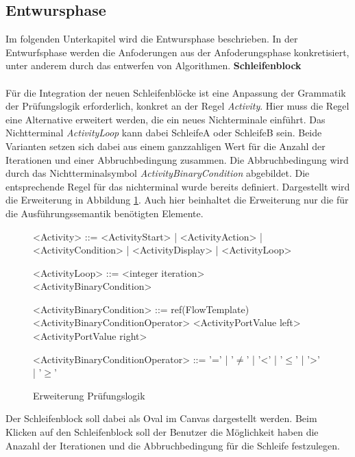 \documentclass{article}
\begin{document}
    \subsection{Entwursphase}
    Im folgenden Unterkapitel wird die Entwursphase beschrieben.
    In der Entwurfsphase werden die Anfoderungen aus der Anfoderungsphase konkretisiert, unter anderem durch das entwerfen von Algorithmen. \cite{24}
    \textbf{Schleifenblock}\\
    \\
    Für die Integration der neuen Schleifenblöcke ist eine Anpassung der Grammatik der Prüfungslogik erforderlich, konkret an der Regel \textit{Activity}.    
    Hier muss die Regel eine Alternative erweitert werden, die ein neues Nichterminale einführt.
    Das Nichtterminal \textit{ActivityLoop} kann dabei SchleifeA oder SchleifeB sein.
    Beide Varianten setzen sich dabei aus einem ganzzahligen Wert für die Anzahl der Iterationen und einer Abbruchbedingung zusammen.
    Die Abbruchbedingung wird durch das Nichtterminalsymbol \textit{ActivityBinaryCondition} abgebildet.
    Die entsprechende Regel für das nichterminal wurde bereits definiert.
    Dargestellt wird die Erweiterung in Abbildung \ref{Erweiterung Prüfungslogik}.
    Auch hier beinhaltet die Erweiterung nur die für die Ausführungssemantik benötigten Elemente.\\
    \begin{figure}[H]
        \begin{grammar}
            <Activity> ::= <ActivityStart>
            | <ActivityAction>
            | <ActivityCondition>
            | <ActivityDisplay>
            | <ActivityLoop>

            <ActivityLoop> ::= <integer iteration> <ActivityBinaryCondition>

            <ActivityBinaryCondition> ::= ref(FlowTemplate) <ActivityBinaryConditionOperator> <ActivityPortValue left> <ActivityPortValue right>

            <ActivityBinaryConditionOperator> ::= '='
            | '$\neq$' 
            | '\textless' 
            | '$\leq$' 
            | '\textgreater' 
            | '$\geq$'
        \end{grammar}
        \caption{Erweiterung Prüfungslogik}
        \label{Erweiterung Prüfungslogik}
    \end{figure}
    \noindent
    Der Schleifenblock soll dabei als Oval im Canvas dargestellt werden.
    Beim Klicken auf den Schleifenblock soll der Benutzer die Möglichkeit haben die Anazahl der Iterationen und die Abbruchbedingung für die Schleife festzulegen.
\end{document}
